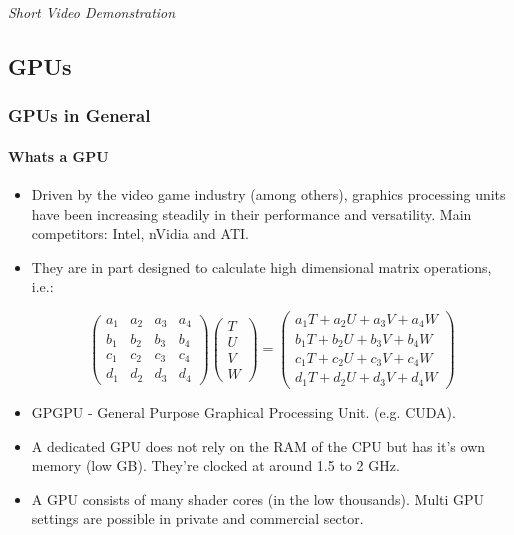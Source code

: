 \documentclass[9pt]{beamer}
\begin{document}
\begin{frame}{}
  \centering \Large
  \emph{Short Video Demonstration}
\end{frame}

\subsection{GPUs}
\begin{frame}
\frametitle{GPUs in General}
\framesubtitle{Whats a GPU}
\begin{itemize}
\item Driven by the video game industry (among others), graphics processing units have been increasing steadily in their performance and versatility. Main competitors: Intel, nVidia and ATI.
\item They are in part designed to calculate high dimensional matrix operations, i.e.: 
\begin{figure}
\small
$$
\left(
\begin{matrix}
a_1 & a_2 & a_3 & a_4 \\
b_1 & b_2 & b_3 & b_4 \\
c_1 & c_2 & c_3 & c_4 \\
d_1 & d_2 & d_3 & d_4
\end{matrix}
\right)
\left(
\begin{matrix}
T \\
U \\
V \\
W
\end{matrix}
\right)
=
\left(
\begin{matrix}
a_1T + a_2U + a_3V + a_4W \\
b_1T + b_2U + b_3V + b_4W \\
c_1T + c_2U + c_3V + c_4W \\
d_1T + d_2U + d_3V + d_4W
\end{matrix}
\right)
$$
\end{figure}
\item GPGPU - General Purpose Graphical Processing Unit. (e.g. CUDA).
\item A dedicated GPU does not rely on the RAM of the CPU but has it's own memory (low GB). They're clocked at around 1.5 to 2 GHz.
\item A GPU consists of many shader cores (in the low thousands). Multi GPU settings are possible in private and commercial sector.
\end{itemize}
\end{frame}
\end{document}
